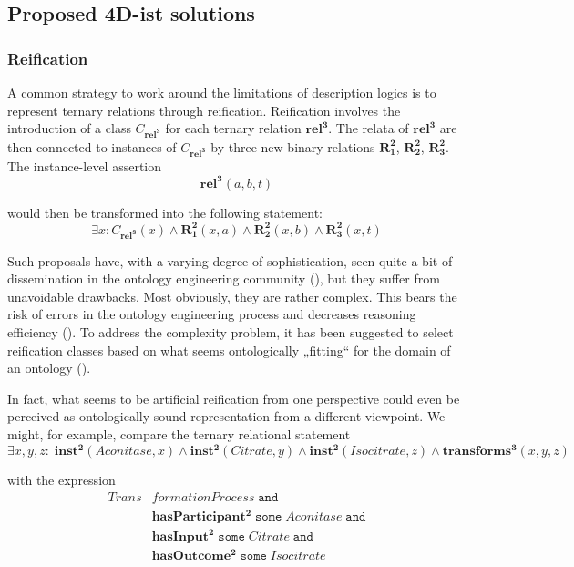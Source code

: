 \documentclass{ao2e}
\newcommand{\mirel}[1]{\ensuremath{\mathrm{\mathbf{#1}}}}
\newcommand{\mclass}[1]{\ensuremath{\mathit{#1}}}
\newcommand{\mrel}[2]{\mirel{#1^#2}}
\newcommand{\mrelb}[1]{\mrel{#1}{2}}
\newcommand{\mrelt}[1]{\mrel{#1}{3}}
\begin{document}
\subsection{Proposed 4D-ist solutions}
\subsubsection{Reification}

A common strategy to work around the limitations of description logics is to
represent ternary relations through reification. Reification involves the
introduction of a class $\mclass{C_\mrelt{rel}}$ for each ternary relation
\mrelt{rel}. The relata of \mrelt{rel}
are then connected to instances of $\mclass{C_\mrelt{rel}}$ by three new binary
relations \mrelb{R_1}, \mrelb{R_2},
\mrelb{R_3}. The instance-level assertion
$$
\mrelt{rel}(a,b,t)
$$

would then be transformed into the following statement:
\begin{equation}
\exists x: \mclass{C_\mrelt{rel}}(x) \wedge
\mrelb{R_1}(x,a) \wedge
\mrelb{R_2}(x,b) \wedge
\mrelb{R_3}(x,t) 
\end{equation}

Such proposals have, with a varying degree of sophistication, seen quite a bit
of dissemination in the ontology engineering community (\cite{ODP:nary}), but they suffer
from unavoidable drawbacks. Most obviously, they are rather complex. This bears
the risk of errors in the ontology engineering process and decreases reasoning
efficiency (\cite{Grewe:2010}). To address the complexity problem, it has been suggested to
select reification classes based on what seems ontologically „fitting“ for the
domain of an ontology (\cite{Fiadeiro:2010}).

In fact, what seems to be artificial reification from one perspective could even
be perceived as ontologically sound representation from a different viewpoint.
We might, for example, compare the ternary relational statement
\begin{equation}
\exists x,y,z:\;\mrelb{inst}(\mclass{Aconitase},x) \wedge
\mrelb{inst}(\mclass{Citrate},y) \wedge \mrelb{inst}(\mclass{Isocitrate},z)
\wedge  \mrelt{transforms}(x,y,z)
\end{equation}

with the expression
\begin{equation}
\begin{split}\mclass{Trans}&\mclass{formationProcess}\;\mathtt{and}\\ 
            &\mrelb{hasParticipant}\;\mathtt{some}\;\mclass{Aconitase}
\;\mathtt{and} \\
            &\mrelb{hasInput}\;\mathtt{some}\;\mclass{Citrate}\;\mathtt{and}\\\ 
            &\mrelb{hasOutcome}\;\mathtt{some}\;\mclass{Isocitrate}
\end{split}
\end{equation}
\end{document}
